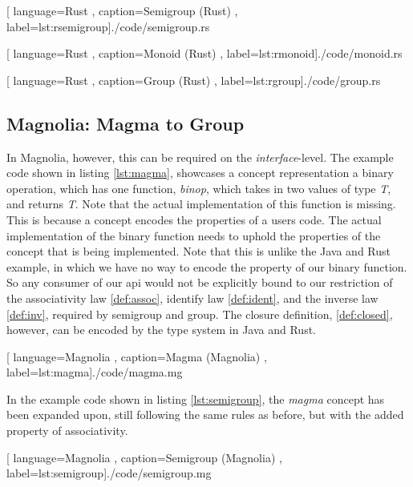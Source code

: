 \begin{center}
  
    [ language=Rust
    , caption={Semigroup (Rust)}
    , label=lst:rsemigroup]{./code/semigroup.rs}
\end{center}

\begin{center}
  
    [ language=Rust
    , caption={Monoid (Rust)}
    , label=lst:rmonoid]{./code/monoid.rs}
\end{center}

\begin{center}
  
    [ language=Rust
    , caption={Group (Rust)}
    , label=lst:rgroup]{./code/group.rs}
\end{center}

\subsection{Magnolia: Magma to Group}

In Magnolia, however, this can be required on the \textit{interface}-level. The
example code shown in listing \ref{lst:magma}, showcases a concept
representation a binary operation, which has one function, \textit{binop}, which
takes in two values of type \textit{T}, and returns \textit{T}. Note that the
actual implementation of this function is missing. This is because a concept
encodes the properties of a users code. The actual implementation of the
binary function needs to uphold the properties of the concept that is
being implemented. Note that this is unlike the Java and Rust example, in
which we have no way to encode the property of our binary function. So any
consumer of our \gls{api} would not be explicitly bound to our restriction of
the associativity law \ref{def:assoc}, identify law \ref{def:ident}, and the
inverse law \ref{def:inv}, required by semigroup and group. The closure
definition, \ref{def:closed}, however, can be encoded by the type system in Java
and Rust.

\begin{center}
  
    [ language=Magnolia
    , caption={Magma (Magnolia)}
    , label=lst:magma]{./code/magma.mg}
\end{center}

In the example code shown in listing \ref{lst:semigroup}, the \textit{magma}
concept has been expanded upon, still following the same rules as before, but
with the added property of associativity.

\begin{center}
  
    [ language=Magnolia
    , caption={Semigroup (Magnolia)}
    , label=lst:semigroup]{./code/semigroup.mg}
\end{center}

